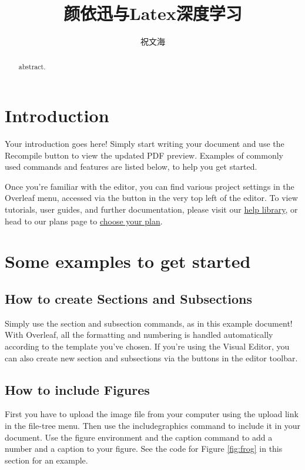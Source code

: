 \documentclass{article}
\title{颜依迅与Latex深度学习}
\author{祝文海}
\begin{document}
	\maketitle
	
	\begin{abstract}
		abstract.
	\end{abstract}
	
	\section{Introduction}
	
	Your introduction goes here! Simply start writing your document and use the Recompile button to view the updated PDF preview. Examples of commonly used commands and features are listed below, to help you get started.
	
	Once you're familiar with the editor, you can find various project settings in the Overleaf menu, accessed via the button in the very top left of the editor. To view tutorials, user guides, and further documentation, please visit our \href{https://www.overleaf.com/learn}{help library}, or head to our plans page to \href{https://www.overleaf.com/user/subscription/plans}{choose your plan}.
	
	\section{Some examples to get started}
	
	\subsection{How to create Sections and Subsections}
	
	Simply use the section and subsection commands, as in this example document! With Overleaf, all the formatting and numbering is handled automatically according to the template you've chosen. If you're using the Visual Editor, you can also create new section and subsections via the buttons in the editor toolbar.
	
	\subsection{How to include Figures}
	
	First you have to upload the image file from your computer using the upload link in the file-tree menu. Then use the includegraphics command to include it in your document. Use the figure environment and the caption command to add a number and a caption to your figure. See the code for Figure \ref{fig:frog} in this section for an example.
	
\end{document}
